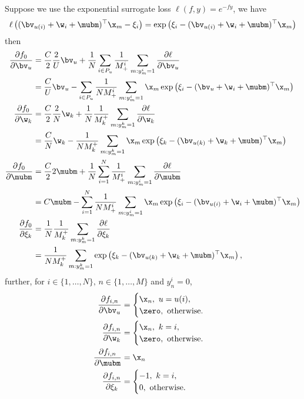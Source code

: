 Suppose we use the exponential surrogate loss $\ell(f, y) = e^{-fy}$, we have
\begin{equation*}
\ell \left( (\bv_{u(i)} + \w_i + \mubm)^\top \x_m - \xi_i \right) 
= \exp \left( \xi_i - (\bv_{u(i)} + \w_i + \mubm)^\top \x_m \right)
\end{equation*}
then
\begin{equation*}
\begin{aligned}
\frac{\partial f_0}{\partial \bv_u}
&= \frac{C}{2} \frac{2}{U} \bv_u + \frac{1}{N} \sum_{i \in P_u} \frac{1}{M_+^i} \sum_{m: y_m^i=1} \frac{\partial \ell}{\partial \bv_u} \\
&= \frac{C}{U} \bv_u - \sum_{i \in P_u} \frac{1}{N M_+^i} \sum_{m: y_m^i=1} \x_m \exp \left( \xi_i - (\bv_u + \w_i + \mubm)^\top \x_m \right) \\
%
\frac{\partial f_0}{\partial \w_k}
&= \frac{C}{2} \frac{2}{N} \w_k + \frac{1}{N} \frac{1}{M_k^+} \sum_{m: y_m^k=1} \frac{\partial \ell}{\partial \w_k} \\
&= \frac{C}{N} \w_k - \frac{1}{N M_k^+} \sum_{m: y_m^k=1} \x_m \exp \left( \xi_k - (\bv_{u(k)} + \w_k + \mubm)^\top \x_m \right) \\
%
\frac{\partial f_0}{\partial \mubm}
&= \frac{C}{2} 2 \mubm + \frac{1}{N} \sum_{i=1}^N \frac{1}{M_+^i} \sum_{m: y_m^i=1} \frac{\partial \ell}{\partial \mubm} \\
&= C \mubm - \sum_{i=1}^N \frac{1}{N M_+^i} \sum_{m: y_m^i=1} \x_m \exp \left( \xi_i - (\bv_{u(i)} + \w_i + \mubm)^\top \x_m \right) \\
%
\frac{\partial f_0}{\partial \xi_k}
&= \frac{1}{N} \frac{1}{M_k^+} \sum_{m: y_m^k=1} \frac{\partial \ell}{\partial \xi_k} \\
&= \frac{1}{N M_k^+} \sum_{m: y_m^k=1} \exp \left( \xi_k - (\bv_{u(k)} + \w_k + \mubm)^\top \x_m \right),
\end{aligned}
\end{equation*}
%
further, for $i \in \{1,\dots,N\}, \, n \in \{1,\dots,M\}$ and $y_n^i = 0$,
\begin{equation*}
\begin{aligned}
\frac{\partial f_{i,n}}{\partial \bv_u}
&= \begin{cases}
\x_n, \ u = u(i), \\
\zero, \ \text{otherwise}.
\end{cases} \\
%
\frac{\partial f_{i,n}}{\partial \w_k}
&= \begin{cases}
\x_n, \ k = i, \\
\zero, \ \text{otherwise}.
\end{cases} \\
%
\frac{\partial f_{i,n}}{\partial \mubm} &= \x_n \\
%
\frac{\partial f_{i,n}}{\partial \xi_k}
&= \begin{cases}
-1, \ k = i, \\
0, \ \text{otherwise}.
\end{cases}
\end{aligned}
\end{equation*}

